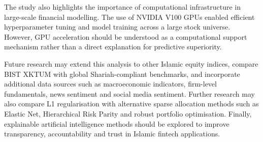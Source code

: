 The study also highlights the importance of computational infrastructure in large-scale financial modelling. The use of NVIDIA V100 GPUs enabled efficient hyperparameter tuning and model training across a large stock universe. However, GPU acceleration should be understood as a computational support mechanism rather than a direct explanation for predictive superiority.

Future research may extend this analysis to other Islamic equity indices, compare BIST XKTUM with global Shariah-compliant benchmarks, and incorporate additional data sources such as macroeconomic indicators, firm-level fundamentals, news sentiment and social media sentiment. Further research may also compare L1 regularisation with alternative sparse allocation methods such as Elastic Net, Hierarchical Risk Parity and robust portfolio optimisation. Finally, explainable artificial intelligence methods should be explored to improve transparency, accountability and trust in Islamic fintech applications.